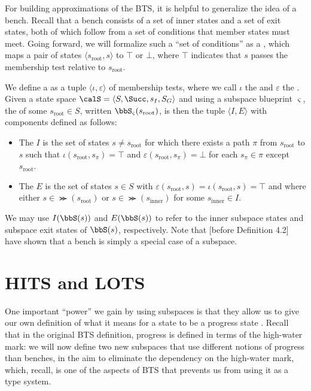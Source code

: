 For building approximations of the BTS, it is helpful to generalize the idea of a bench. Recall that a bench consists of a set of inner states and a set of exit states, both of which follow from a set of conditions that member states must meet. Going forward, we will formalize such a ``set of conditions'' as a , which maps a pair of states $\langle s_\text{root},s\rangle$ to $\top$ or $\bot$, where $\top$ indicates that $s$ passes the membership test relative to $s_\text{root}$.

We define a  as a tuple $\langle\iota,\varepsilon\rangle$ of membership tests, where we call $\iota$ the  and $\varepsilon$ the . Given a state space $\calS=\langle S,\Succ,s_I,S_G\rangle$ and using a subspace blueprint $\varsigma$, the  of some $s_\text{root}\in S$, written $\bbS_\varsigma(s_\text{root})$, is then the tuple $\langle I,E\rangle$ with components defined as follows:

\begin{itemize}
    \item The  $I$ is the set of states $s\neq s_\text{root}$ for which there exists a path $\pi$ from $s_\text{root}$ to $s$ such that $\iota(s_\text{root},s_\pi)=\top$ and $\varepsilon(s_\text{root},s_\pi)=\bot$ for each $s_\pi\in\pi$ except $s_\text{root}$.
    \item The  $E$ is the set of states $s\in S$ with $\varepsilon(s_\text{root},s)=\iota(s_\text{root},s)=\top$ and where either $s\in\Succ(s_\text{root})$ or $s\in\Succ(s_\text{inner})$ for some $s_\text{inner}\in I$.
\end{itemize}

We may use $I(\bbS(s))$ and $E(\bbS(s))$ to refer to the inner subspace states and subspace exit states of $\bbS(s)$, respectively. Note that  [before Definition 4.2] have shown that a bench is simply a special case of a subspace.

\section{HITS and LOTS}

One important ``power'' we gain by using subspaces is that they allow us to give our own definition of what it means for a state to be a progress state . Recall that in the original BTS definition, progress is defined in terms of the high-water mark: we will now define two new subspaces that use different notions of progress than benches, in the aim to eliminate the dependency on the high-water mark, which, recall, is one of the aspects of BTS that prevents us from using it as a type system.

